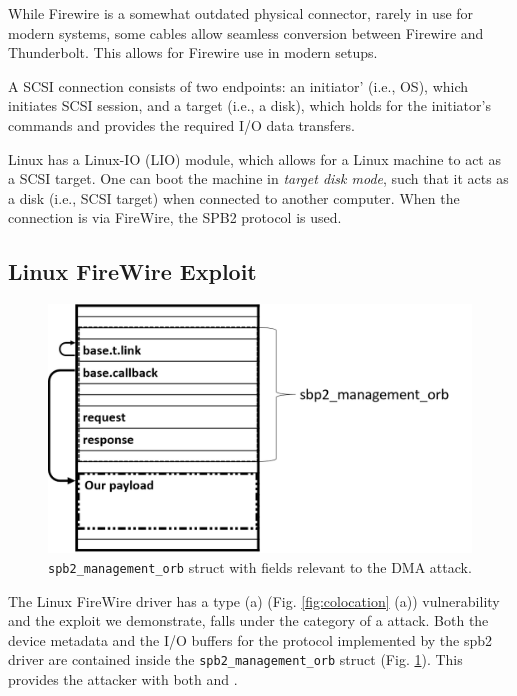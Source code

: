 While Firewire is a somewhat outdated physical connector, rarely in use for modern systems, some cables allow seamless conversion between Firewire and Thunderbolt. This allows for Firewire use in modern setups.

A SCSI connection consists of two endpoints: an initiator' (i.e., OS), which initiates SCSI session, and a target (i.e., a disk), which holds for the initiator's commands and provides the required I/O data transfers. 

Linux has a Linux-IO (LIO) module, which allows for a Linux machine to act as a SCSI target. One can boot the machine in \emph{target disk mode}, such that it acts as a disk (i.e., SCSI target) when connected to another computer. When the connection is via FireWire, the SPB2 protocol is used.

\subsection{Linux FireWire Exploit} \label{sec:sbp2_attack}
\begin{figure}
    \centering
    \includegraphics[width=1\linewidth]{figs/sbp.png}
    \caption{\texttt{spb2\_management\_orb} struct with fields relevant to the DMA attack.}
    \label{fig:orb}
\end{figure}

The Linux FireWire driver has a type (a) (Fig. \ref{fig:colocation} (a)) \subpage{} vulnerability and the exploit we demonstrate, falls under the category of a \simple{} attack. Both the device metadata and the I/O buffers for the \spb{} protocol implemented by the spb2 driver are contained inside the \texttt{spb2\_management\_orb} struct (Fig. \ref{fig:orb}). This provides the attacker with both \means{} and \oportunity{}.

